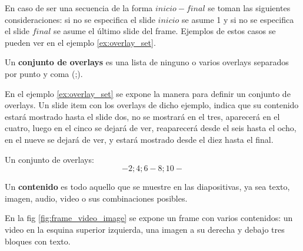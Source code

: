  		En caso de ser una secuencia de la forma \( inicio-final \) se toman las siguientes consideraciones: si no se especifica el slide \( inicio \) se asume 1 y si no se especifica el slide \( final \) se asume el último slide del frame. Ejemplos de estos casos se pueden ver en el ejemplo \ref{ex:overlay_set}. 		

 		\begin{definition}
 		\label{def:ovaerlay_set}
 			Un \textbf{conjunto de overlays} es una lista de ninguno o varios overlays separados por punto y coma (;).
 		\end{definition} 


		En el ejemplo \ref{ex:overlay_set} se expone la manera para definir un conjunto de overlays. Un slide item con los overlays de dicho ejemplo, indica que su contenido estará mostrado hasta el slide dos, no se mostrará en el tres, aparecerá en el cuatro, luego en el cinco se dejará de ver, reaparecerá desde el seis hasta el ocho, en el nueve se dejará de ver, y estará mostrado desde el diez hasta el final.  	

 		\begin{example}
 		\label{ex:overlay_set}
 			Un conjunto de overlays:
 			$$-2; 4; 6-8; 10-$$
 		\end{example}	

					

		\begin{definition}
		\label{def:content}
			Un \textbf{contenido} es todo aquello que se muestre en las diapositivas, ya sea texto, imagen, audio, video o sus combinaciones posibles. 
		\end{definition}


		En la fig \ref{fig:frame_video_image} se expone un frame con varios contenidos: un video en la esquina superior izquierda, una imagen a su derecha y debajo tres bloques con texto.


